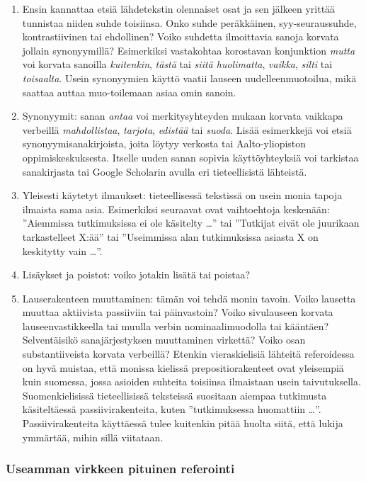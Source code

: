\documentclass[finnish, 12pt, a4paper, arts, utf8, a-2b, online]{aaltothesis}
\begin{document}
\begin{enumerate}
	\item Ensin kannattaa etsiä lähdetekstin olennaiset osat ja sen jälkeen 
	yrittää tunnistaa niiden suhde toisiinsa. Onko suhde peräkkäinen, 
	syy-seuraussuhde, kontrastiivinen tai ehdollinen? Voiko suhdetta ilmoittavia 
	sanoja korvata jollain synonyymillä? Esimerkiksi vastakohtaa korostavan 
	konjunktion \emph{mutta} voi korvata sanoilla \emph{kuitenkin}, \emph{tästä}
	tai \emph{siitä huolimatta}, \emph{vaikka}, \emph{silti} tai 
	\emph{toisaalta}. Usein synonyymien käyttö vaatii lauseen 
	uudelleenmuotoilua, mikä saattaa auttaa muo-toilemaan asiaa omin sanoin.
	\item Synonyymit: sanan \emph{antaa} voi merkitysyhteyden mukaan korvata 
	vaikkapa verbeillä \emph{mahdollistaa}, \emph{tarjota}, \emph{edistää} tai 
	\emph{suoda}. Lisää esimerkkejä voi etsiä synonyymisanakirjoista, joita 
	löytyy verkosta tai Aalto-yliopiston oppimiskeskuksesta. Itselle uuden sanan
	sopivia käyttöyhteyksiä voi tarkistaa sanakirjasta tai Google Scholarin 
	avulla eri tieteellisistä lähteistä.
	\item Yleisesti käytetyt ilmaukset: tieteellisessä tekstissä on usein monia 
	tapoja ilmaista sama asia. Esimerkiksi seuraavat ovat vaihtoehtoja 
	keskenään: ”Aiemmissa tutkimuksissa ei ole käsitelty \ldots” tai ”Tutkijat 
	eivät ole juurikaan tarkastelleet X:ää” tai ”Useimmissa alan tutkimuksissa 
	asiasta X on keskitytty vain \ldots”.
	\item Lisäykset ja poistot: voiko jotakin lisätä tai poistaa?
	\item Lauserakenteen muuttaminen: tämän voi tehdä monin tavoin. Voiko 
	lausetta muuttaa aktiivista passiiviin tai päinvastoin? Voiko sivulauseen 
	korvata lauseenvastikkeella tai muulla verbin nominaalimuodolla tai 
	kääntäen? Selventäisikö sanajärjestyksen muuttaminen virkettä? Voiko osan 
	substantiiveista korvata verbeillä? Etenkin vieraskielisiä lähteitä 
	referoidessa on hyvä muistaa, että monissa kielissä prepositiorakenteet ovat 
	yleisempiä kuin suomessa, jossa asioiden suhteita toisiinsa ilmaistaan usein 
	taivutuksella. Suomenkielisissä tieteellisissä teksteissä suositaan aiempaa 
	tutkimusta käsiteltäessä  passiivirakenteita, kuten ”tutkimuksessa 
	huomattiin \ldots”. Passiivirakenteita käyttäessä tulee kuitenkin pitää 
	huolta siitä, että lukija ymmärtää, mihin sillä viitataan.
\end{enumerate}


\subsubsection*{Useamman virkkeen pituinen referointi}
\end{document}
